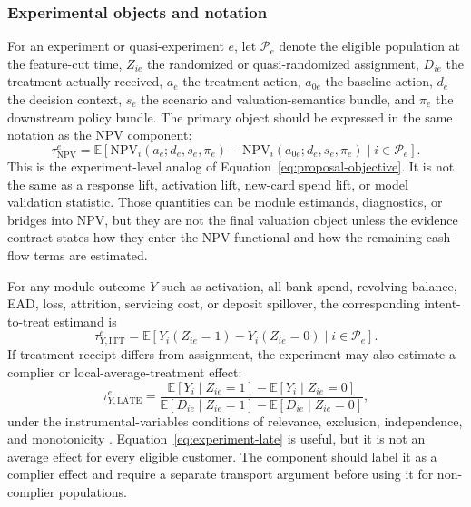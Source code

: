 \documentclass[11pt]{article}
\newcommand{\E}{\mathbb{E}}
\newcommand{\NPV}{\mathrm{NPV}}
\newcommand{\1}{\mathbf{1}}
\begin{document}
\subsubsection{Experimental objects and notation}

For an experiment or quasi-experiment $e$, let $\mathcal{P}_e$ denote the
eligible population at the feature-cut time, $Z_{ie}$ the randomized or
quasi-randomized assignment, $D_{ie}$ the treatment actually received, $a_e$
the treatment action, $a_{0e}$ the baseline action, $d_e$ the decision context,
$s_e$ the scenario and valuation-semantics bundle, and $\pi_e$ the downstream
policy bundle. The primary object should be expressed in the same notation as
the NPV component:
\begin{equation}
  \tau^{e}_{\NPV}
  =
  \E\!\left[
    \NPV_i(a_e;d_e,s_e,\pi_e)
    -
    \NPV_i(a_{0e};d_e,s_e,\pi_e)
    \mid i\in\mathcal{P}_e
  \right].
  \label{eq:experiment-npv-estimand}
\end{equation}
This is the experiment-level analog of
Equation~\eqref{eq:proposal-objective}. It is not the same as a response lift,
activation lift, new-card spend lift, or model validation statistic. Those
quantities can be module estimands, diagnostics, or bridges into NPV, but they
are not the final valuation object unless the evidence contract states how
they enter the NPV functional and how the remaining cash-flow terms are
estimated.

For any module outcome $Y$ such as activation, all-bank spend, revolving
balance, EAD, loss, attrition, servicing cost, or deposit spillover, the
corresponding intent-to-treat estimand is
\begin{equation}
  \tau^{e}_{Y,\mathrm{ITT}}
  =
  \E[Y_i(Z_{ie}=1)-Y_i(Z_{ie}=0)\mid i\in\mathcal{P}_e].
  \label{eq:experiment-itt}
\end{equation}
If treatment receipt differs from assignment, the experiment may also estimate
a complier or local-average-treatment effect:
\begin{equation}
  \tau^{e}_{Y,\mathrm{LATE}}
  =
  \frac{\E[Y_i\mid Z_{ie}=1]-\E[Y_i\mid Z_{ie}=0]}
       {\E[D_{ie}\mid Z_{ie}=1]-\E[D_{ie}\mid Z_{ie}=0]},
  \label{eq:experiment-late}
\end{equation}
under the instrumental-variables conditions of relevance, exclusion,
independence, and monotonicity
\citep{angristimbensrubin1996iv}. Equation~\eqref{eq:experiment-late} is
useful, but it is not an average effect for every eligible customer. The
component should label it as a complier effect and require a separate
transport argument before using it for non-complier populations.
\end{document}
